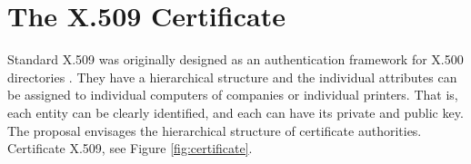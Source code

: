 \documentclass[
  digital, %
  notable,   %
  lof,     %
  lot,     %
]{fithesis3}
\begin{document}
\section{The X.509 Certificate}
Standard X.509 was originally designed as an authentication framework for X.500 
directories \cite{schmeh2006cryptography}. They have a hierarchical structure and the 
individual attributes can be assigned to individual computers of companies or individual 
printers. That is, each entity can be clearly identified, and each can have its private and 
public key. The proposal envisages the hierarchical structure of certificate authorities. 
Certificate X.509, see Figure \ref{fig:certificate}.
\end{document}

